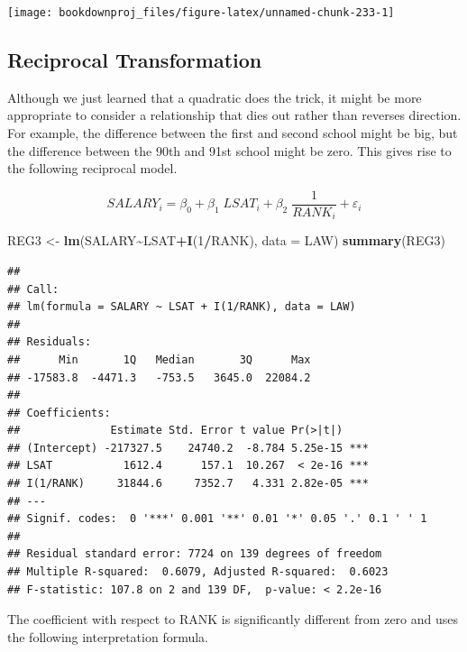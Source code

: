 \documentclass[
]{book}
\newenvironment{Shaded}{\begin{snugshade}}{\end{snugshade}}
\newcommand{\AttributeTok}[1]{\textcolor[rgb]{0.13,0.29,0.53}{#1}}
\newcommand{\DecValTok}[1]{\textcolor[rgb]{0.00,0.00,0.81}{#1}}
\newcommand{\FunctionTok}[1]{\textcolor[rgb]{0.13,0.29,0.53}{\textbf{#1}}}
\newcommand{\NormalTok}[1]{#1}
\newcommand{\OtherTok}[1]{\textcolor[rgb]{0.56,0.35,0.01}{#1}}
\newcommand{\SpecialCharTok}[1]{\textcolor[rgb]{0.81,0.36,0.00}{\textbf{#1}}}
\begin{document}
\begin{center}\texttt{[image: bookdownproj\_files/figure-latex/unnamed-chunk-233-1]} \end{center}

\subsection*{Reciprocal Transformation}\label{reciprocal-transformation}

Although we just learned that a quadratic does the trick, it might be more appropriate to consider a relationship that dies out rather than reverses direction. For example, the difference between the first and second school might be big, but the difference between the 90th and 91st school might be zero. This gives rise to the following reciprocal model.

\[SALARY_i = \beta_0 + \beta_1 \; LSAT_i + \beta_2 \; \frac{1}{RANK_i} + \varepsilon_i\]

\begin{Shaded}
\begin{Highlighting}[]
\NormalTok{REG3 }\OtherTok{\textless{}{-}} \FunctionTok{lm}\NormalTok{(SALARY}\SpecialCharTok{\textasciitilde{}}\NormalTok{LSAT}\SpecialCharTok{+}\FunctionTok{I}\NormalTok{(}\DecValTok{1}\SpecialCharTok{/}\NormalTok{RANK),}
           \AttributeTok{data =}\NormalTok{ LAW)}
\FunctionTok{summary}\NormalTok{(REG3)}
\end{Highlighting}
\end{Shaded}

\begin{verbatim}
## 
## Call:
## lm(formula = SALARY ~ LSAT + I(1/RANK), data = LAW)
## 
## Residuals:
##      Min       1Q   Median       3Q      Max 
## -17583.8  -4471.3   -753.5   3645.0  22084.2 
## 
## Coefficients:
##              Estimate Std. Error t value Pr(>|t|)    
## (Intercept) -217327.5    24740.2  -8.784 5.25e-15 ***
## LSAT           1612.4      157.1  10.267  < 2e-16 ***
## I(1/RANK)     31844.6     7352.7   4.331 2.82e-05 ***
## ---
## Signif. codes:  0 '***' 0.001 '**' 0.01 '*' 0.05 '.' 0.1 ' ' 1
## 
## Residual standard error: 7724 on 139 degrees of freedom
## Multiple R-squared:  0.6079, Adjusted R-squared:  0.6023 
## F-statistic: 107.8 on 2 and 139 DF,  p-value: < 2.2e-16
\end{verbatim}

The coefficient with respect to RANK is significantly different from zero and uses the following interpretation formula.
\end{document}
